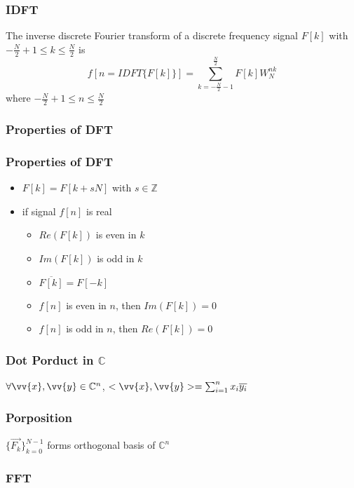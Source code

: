 \documentclass[11pt]{article}
\newcommand{\C}{{\mathbb{C}}}
\newcommand{\Z}{{\mathbb{Z}}}
\newcommand{\vx}{\vv{x}}
\newcommand{\vy}{\vv{y}}
\begin{document}
\subsubsection*{IDFT}
The inverse discrete Fourier transform of a discrete frequency signal $F[k]$ with $-\frac{N}{2}+1\leq k\leq \frac{N}{2}$ is 
\[f[n = IDFT\{F[k]\}] = \sum_{k=-\frac{N}{2}-1}^{\frac{N}{2}}F[k]W_N^{nk}\]
where $-\frac{N}{2}+1\leq n\leq \frac{N}{2}$
\subsubsection{Properties of DFT}
\subsubsection*{Properties of DFT}
\begin{itemize}
  \item $F[k] = F[k+sN]$ with $s\in\Z$
  \item if signal $f[n]$ is real 
  \begin{itemize}
    \item $Re(F[k])$ is even in $k$
    \item $Im(F[k])$ is odd in $k$
    \item $\overline{F[k]} = F[-k]$
    \item $f[n]$ is even in $n$, then $Im(F[k])=0$
    \item $f[n]$ is odd in $n$, then $Re(F[k])=0$
  \end{itemize}
\end{itemize}
\subsubsection*{Dot Porduct in $\C$}
$\forall\vx,\vy\in\C^n$, $<\vx,\vy>=\sum_{i=1}^{n}x_i\overline{y_i}$
\subsubsection*{Porposition}
$\{\vec{F_k}\}_{k=0}^{N-1}$ forms orthogonal basis of $\C^n$
\subsubsection{FFT}
\end{document}
